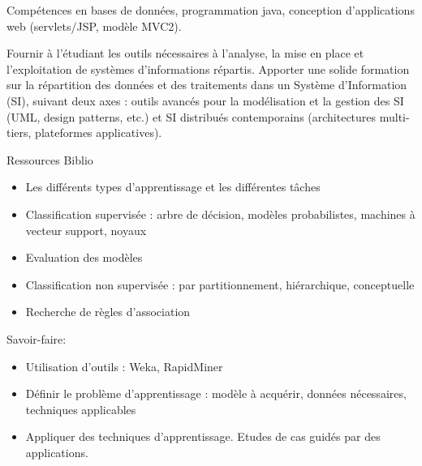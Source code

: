 {Compétences en bases de données, programmation java, conception d'applications web (servlets/JSP, modèle MVC2).} 
{\begin{itemize} 
  \ObjItem Fournir à l'étudiant les outils nécessaires à l'analyse, la mise en place et
l'exploitation de systèmes d'informations répartis.
  \ObjItem Apporter une solide
formation sur la répartition des données et des traitements dans un
Système d'Information (SI), suivant deux axes : outils avancés pour la
modélisation et la gestion des SI (UML, design patterns, etc.) et SI
distribués contemporains (architectures multi-tiers, plateformes
applicatives).
\end{itemize} 
} 
{Ressources}
{Biblio}

\vfill

{
\begin{itemize} 
\item Les différents types d'apprentissage et les différentes tâches
\item Classification supervisée : arbre de décision, modèles probabilistes,
machines à vecteur support, noyaux
\item Evaluation des modèles
\item Classification non supervisée : par partitionnement, hiérarchique,
conceptuelle
\item Recherche de règles d'association
\end{itemize} 
Savoir-faire:
\begin{itemize} 
\item Utilisation d'outils : Weka, RapidMiner
\item Définir le problème d'apprentissage : modèle à acquérir, données
nécessaires, techniques applicables
\item Appliquer des techniques d'apprentissage.
Etudes de cas guidés par des applications.
\end{itemize} 
} 
